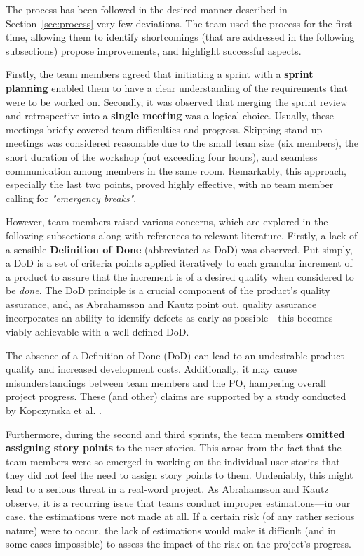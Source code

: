 \documentclass[conference]{IEEEtran}
\begin{document}
The process has been followed in the desired manner described in
Section~\ref{sec:process} very few deviations. The team used the process for
the first time, allowing them to identify shortcomings (that are addressed in
the following subsections) propose improvements, and highlight successful
aspects. 

Firstly, the team members agreed that initiating a sprint with a 
\textbf{sprint planning} enabled them to have a clear understanding of the requirements
that were to be worked on. Secondly, it was observed that merging the sprint
review and retrospective into a \textbf{single meeting} was a logical choice.
Usually, these meetings briefly covered team difficulties and progress.
Skipping stand-up meetings was considered reasonable due to the small team size
(six members), the short duration of the workshop (not exceeding four hours),
and seamless communication among members in the same room. Remarkably, this
approach, especially the last two points, proved highly effective, with no team
member calling for \textit{"emergency breaks"}.

However, team members raised various concerns, which are explored in the
following subsections along with references to relevant literature. Firstly, a
lack of a sensible \textbf{Definition of Done} (abbreviated as DoD) was
observed. Put simply, a DoD is a set of criteria points applied iteratively to
each granular increment of a product to assure that the increment is of a
desired quality \cite{Kopczynska2022} when considered to be \textit{done}. The
DoD principle is a crucial component of the product's quality assurance, and,
as Abrahamsson and Kautz \cite{Abrahamsson2002} point out, quality assurance
incorporates an ability to identify defects as early as possible---this becomes
viably achievable with a well-defined DoD.

The absence of a Definition of Done (DoD) can lead to an undesirable product
quality and increased development costs. Additionally, it may cause
misunderstandings between team members and the PO, hampering overall project
progress. These (and other) claims are supported by a study conducted by
Kopczynska et al. \cite{Kopczynska2022}.

Furthermore, during the second and third sprints, the team members \textbf{omitted
assigning story points} to the user stories. This arose from the fact that the
team members were so emerged in working on the individual user stories that
they did not feel the need to assign story points to them. Undeniably, this
might lead to a serious threat in a real-word project. As Abrahamsson and Kautz
\cite{Abrahamsson2002} observe, it is a recurring issue that teams conduct improper
estimations---in our case, the estimations were not made at all. If a certain
risk (of any rather serious nature) were to occur, the lack of estimations
would make it difficult (and in some cases impossible) to assess the impact of
the risk on the project's progress.
\end{document}
